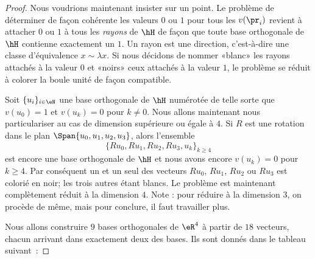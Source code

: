 \begin{proof}
	Nous voudrions maintenant insister sur un point. Le problème de déterminer de façon cohérente les valeurs \( 0\) ou \( 1\) pour tous les \( v(\pr_i)\) revient à attacher \( 0\) ou \( 1\) à tous les \emph{rayons} de \( \hH\) de façon que toute base orthogonale de \( \hH\) contienne exactement un \( 1\). Un rayon est une direction, c'est-à-dire une classe d'équivalence \( x\sim \lambda x\). Si nous décidons de nommer «blanc»  les rayons attachés à la valeur \( 0\) et «noirs»  ceux attachés à la valeur \( 1\), le problème se réduit à colorer la boule unité de façon compatible.

	Soit \( \{ u_i \}_{i\in \eN}\) une base orthogonale de \( \hH\) numérotée de telle sorte que \( v(u_0)=1\) et \( v(u_k)=0\) pour \( k\neq 0\). Nous allons maintenant nous particulariser au cas de dimension supérieure ou égale à \( 4\). Si \( R\) est une rotation dans le plan \( \Span\{ u_0,u_1,u_2,u_3 \}\), alors l'ensemble
	\begin{equation}
		\{ Ru_0,Ru_1,Ru_2,Ru_3,u_k \}_{k\geq 4}
	\end{equation}
	est encore une base orthogonale de \( \hH\) et nous avons encore \( v(u_k)=0\) pour \( k\geq 4\). Par conséquent un et un seul des vecteurs \( Ru_0\), \( Ru_1\), \( Ru_2\) ou \( Ru_3\) est colorié en noir; les trois autres étant blancs. Le problème est maintenant complètement réduit à la dimension \( 4\). Note : pour réduire à la dimension \( 3\), on procède de même, mais pour conclure, il faut travailler plus.

	Nous allons construire \( 9\) bases orthogonales de \( \eR^4\) à partir de \( 18\) vecteurs, chacun arrivant dans exactement deux des bases. Ils sont donnés dans le tableau suivant\ :



\end{proof}
